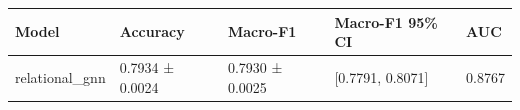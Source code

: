 \begin{tabular}{lllll}
\toprule
Model & Accuracy & Macro-F1 & Macro-F1 95\% CI & AUC \\
\midrule
relational\_gnn & 0.7934 ± 0.0024 & 0.7930 ± 0.0025 & [0.7791, 0.8071] & 0.8767 \\
\bottomrule
\end{tabular}
